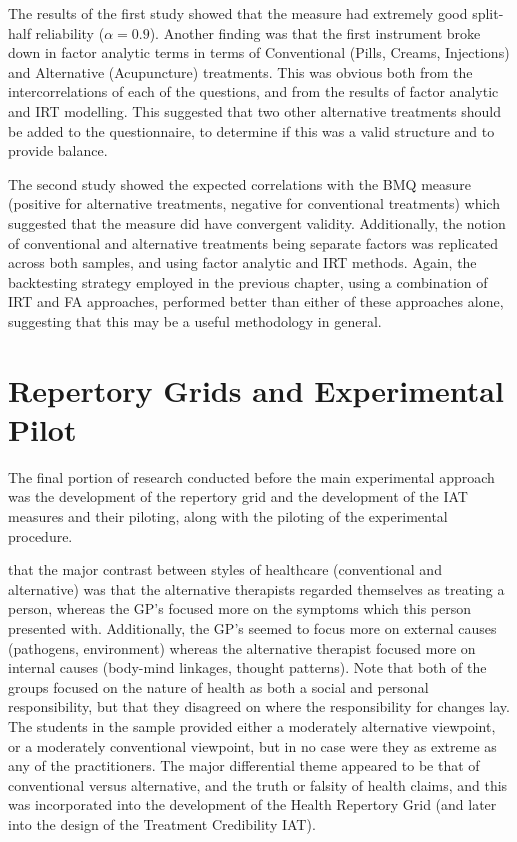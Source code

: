 The results of the first study showed that the measure had extremely
good split-half reliability ($ \alpha=0.9$). Another finding was that
the first instrument broke down in factor analytic terms in terms of
Conventional (Pills, Creams, Injections) and Alternative (Acupuncture)
treatments. This was obvious both from the intercorrelations of each
of the questions, and from the results of factor analytic and IRT
modelling. This suggested that two other alternative treatments should
be added to the questionnaire, to determine if this was a valid
structure and to provide balance.

The second study showed the expected correlations with the BMQ measure
(positive for alternative treatments, negative for conventional
treatments) which suggested that the measure did have convergent
validity. Additionally, the notion of conventional and alternative
treatments being separate factors was replicated across both samples,
and using factor analytic and IRT methods. Again, the backtesting
strategy employed in the previous chapter, using a combination of IRT
and FA approaches, performed better than either of these approaches
alone, suggesting that this may be a useful methodology in general.


\section{Repertory Grids and Experimental Pilot}
\label{sec:qual-rese-rep}

The final portion of research conducted before the main experimental
approach was the development of the repertory grid and the development
of the IAT measures and their piloting, along with the piloting of the
experimental procedure.

that the major contrast between styles of healthcare (conventional and
alternative) was that the alternative therapists regarded themselves
as treating a person, whereas the GP's focused more on the symptoms
which this person presented with. Additionally, the GP's seemed to
focus more on external causes (pathogens, environment) whereas the
alternative therapist focused more on internal causes (body-mind
linkages, thought patterns). Note that both of the groups focused on
the nature of health as both a social and personal responsibility, but
that they disagreed on where the responsibility for changes lay. The
students in the sample provided either a moderately alternative
viewpoint, or a moderately conventional viewpoint, but in no case were
they as extreme as any of the practitioners. The major differential
theme appeared to be that of conventional versus alternative, and the
truth or falsity of health claims, and this was incorporated into the
development of the Health Repertory Grid (and later into the design of
the Treatment Credibility IAT).

